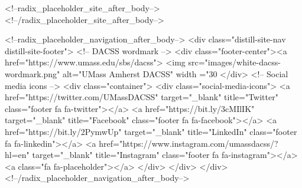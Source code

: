 \documentclass[
]{article}
\begin{document}
<!--radix_placeholder_site_after_body-->
<!--/radix_placeholder_site_after_body-->

<!--radix_placeholder_navigation_after_body-->
<div class="distill-site-nav distill-site-footer">
<!-- DACSS wordmark -->
<div class="footer-center"><a href="https://www.umass.edu/sbs/dacss">
  <img src="images/white-dacss-wordmark.png" 
  alt="UMass Amherst DACSS" width ="30%
</div>
<!-- Social media icons -->
<div class="container">
  <div class="social-media-icons">
    <a href="https://twitter.com/UMassDACSS" target="_blank" title="Twitter" class="footer fa fa-twitter"></a>
    <a href="https://bit.ly/3cMIlIK" target="_blank" title="Facebook" class="footer fa fa-facebook"></a>
    <a href="https://bit.ly/2PymwUp" target="_blank" title="LinkedIn" class="footer fa fa-linkedin"></a>
    <a href="https://www.instagram.com/umassdacss/?hl=en" target="_blank" title="Instagram" class="footer fa fa-instagram"></a>
    <a class="fa fa-placeholder"></a>
  </div>
</div>
</div>
<!--/radix_placeholder_navigation_after_body-->
\end{document}
